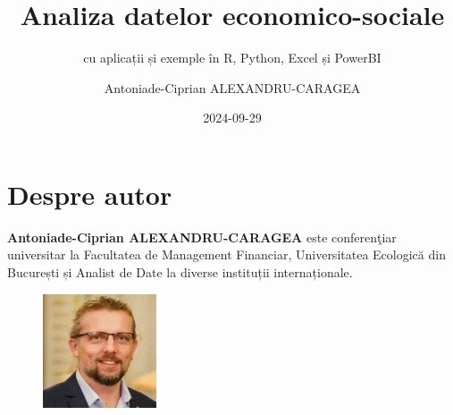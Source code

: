 \documentclass[
  11pt,
  b5paper,
  nottoc]{book}
\title{Analiza datelor economico-sociale}
\subtitle{cu aplicații și exemple în R, Python, Excel și PowerBI}
\author{Antoniade-Ciprian ALEXANDRU-CARAGEA}
\date{2024-09-29}
\renewcommand{\contentsname}{Cuprins}
\renewcommand*\contentsname{Table of contents}
\newcommand\contentsname{Table of contents}
\begin{document}
\frontmatter
\maketitle

\renewcommand*\contentsname{Cuprins}
{
\setcounter{tocdepth}{1}
\tableofcontents
}
\listoffigures
\listoftables

\mainmatter
{}

\chapter*{Despre autor}\label{despre-autor}


\setcounter{page}{3}

\textbf{Antoniade-Ciprian ALEXANDRU-CARAGEA} este conferenţiar
universitar la Facultatea de Management Financiar, Universitatea
Ecologică din București și Analist de Date la diverse instituții
internaționale.\\

\begin{figure}
  \begin{center}
    \includegraphics[width=0.3\textwidth]{images/Ciprian_DGINS2018.jpg}
  \end{center}
\end{figure}
\end{document}
